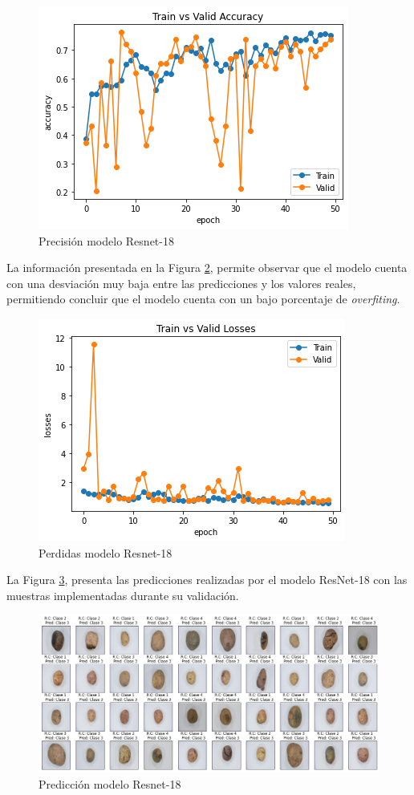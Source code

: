 		\begin{figure}[ht]
			\centering
			\includegraphics[scale=0.5]{Figs/109.png}
			\caption{Precisión modelo Resnet-18}
			\label{fig:preci_RESNET18}
		\end{figure}
	
		La información presentada en la Figura \ref{fig:perdda_RESNET18}, permite observar que el modelo cuenta con una desviación muy baja entre las predicciones y los valores reales, permitiendo concluir que el modelo cuenta con un bajo porcentaje de \textit{overfiting}. 
		
		\begin{figure}[ht]
			\centering
			\includegraphics[scale=0.5]{Figs/110.png}
			\caption{Perdidas modelo Resnet-18}
			\label{fig:perdda_RESNET18}
		\end{figure}

	\newpage
	La Figura \ref{fig:pre_RESNET18}, presenta las predicciones realizadas por el modelo ResNet-18 con las muestras implementadas durante su validación.
	
	\begin{figure}[ht]
		\centering
		\includegraphics[scale=0.35]{Figs/111.png}
		\caption{Predicción modelo Resnet-18}
		\label{fig:pre_RESNET18}
	\end{figure}


